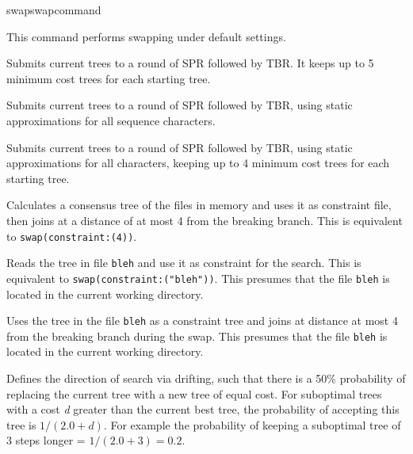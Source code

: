 \begin{command}{swap}{swapcommand}
\begin{arguments}
	\end{arguments}


	\begin{poyexamples} 
            {This command performs swapping under default settings.}

            {Submits current trees to a round of SPR followed by TBR. It keeps
            up to 5 minimum cost trees for each starting tree.}

            {Submits current trees to a round of SPR followed by TBR, using
            static approximations for all sequence characters.}
            
            {Submits current trees to a round of SPR followed by TBR, using
            static approximations for all characters, keeping up to 4 minimum
            cost trees for each starting tree.}
            
            {Calculates a consensus tree of the files in memory and uses it as
            constraint file, then joins at a distance of at most 4 from the breaking
            branch. This is equivalent to \texttt{swap(constraint:(4))}.}
	
            {Reads the tree in file \texttt{bleh} and use it as constraint for the
            search. This is equivalent to \texttt{swap(constraint:("bleh"))}. This 
            presumes that the file \texttt{bleh} is located in the current working directory.}	
		
            {Uses the tree in the file \texttt{bleh} as a constraint tree and joins at
            distance at most 4 from the breaking branch during the swap.  This 
            presumes that the file \texttt{bleh} is located in the current working directory.}
        
            {Defines the direction of search via drifting, such that there is a 50\% probability of 
            replacing the current tree with a new tree of equal cost.  For suboptimal trees with 
            a cost \emph{d} greater than the current best tree, the probability of accepting this tree 
            is $1 / (2.0 + d)$.  For example the
            probability of keeping a suboptimal tree of 3 steps longer = $1 / (2.0 + 3) = 0.2$.}
            

\end{poyexamples}
\end{command}

